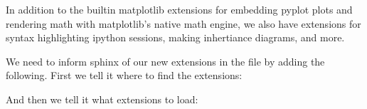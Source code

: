 \documentclass[letterpaper,10pt,english]{sphinxmanual}
\begin{document}
\begin{sphinxVerbatim}[commandchars=\\\{\}]
  
   
  
      
\end{sphinxVerbatim}

\sphinxAtStartPar
In addition to the builtin matplotlib extensions for embedding pyplot
plots and rendering math with matplotlib’s native math engine, we also
have extensions for syntax highlighting ipython sessions, making
inhertiance diagrams, and more.

\sphinxAtStartPar
We need to inform sphinx of our new extensions in the 
file by adding the following.  First we tell it where to find the extensions:

\begin{sphinxVerbatim}[commandchars=\\\{\}]
\end{sphinxVerbatim}

\sphinxAtStartPar
And then we tell it what extensions to load:
\end{document}
